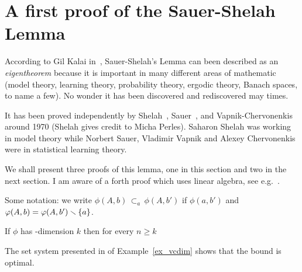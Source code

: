 \documentclass[sputnik.tex]{subfiles}
\begin{document}
\section{A first proof of the Sauer-Shelah Lemma}

According to Gil Kalai in~\cite{kalai}, Sauer-Shelah's Lemma can been described as an \textit{eigentheorem\/} because it is important in many different areas of mathematic (model theory, learning theory, probability theory, ergodic theory, Banach spaces, to name a few).
No wonder it has been discovered and rediscovered may times.

It has been proved independently by Shelah~\cite{shelah72}, Sauer~\cite{sauer}, and Vapnik-Cher\-vo\-nen\-kis~\cite{VC} around 1970 (Shelah gives credit to Micha Perles).
Saharon Shelah was working in model theory while Norbert Sauer, Vladimir Vapnik and Alexey Chervonenkis were in statistical learning theory.

We shall present three proofs of this lemma, one in this section and two in the next section. I am aware of a forth proof which uses linear algebra, see e.g.~\cite{gowers}. 

Some notation: we write $\phi(A,b)$\emph{$\,\subset_a\,$}$\phi(A,b')$ if $\phi(a,b')$ and $\varphi(A,b)=\varphi(A,b')\smallsetminus\{a\}$.


\begin{proposition}\label{prop_Sauer}
If $\phi$ has \vc-dimension $k$ then for every $n\ge k$

\end{proposition}

The set system presented in  of Example~\ref{ex_vcdim} shows that the bound is optimal.
\end{document}

